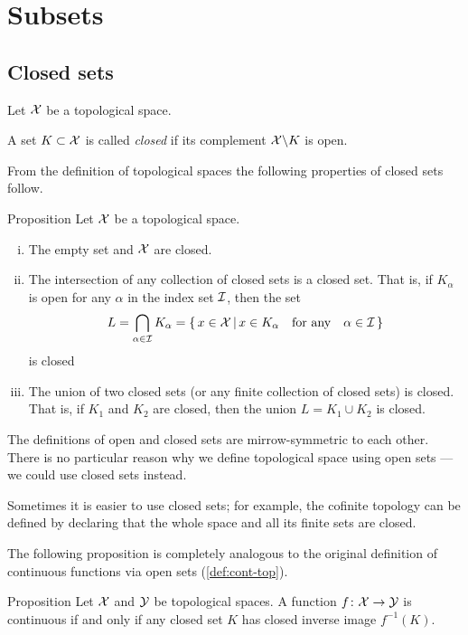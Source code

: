 \chapter{Subsets}

\section{Closed sets}

Let $\mathcal{X}$ be a topological space. 

A set $K\subset \mathcal{X}$ is called \emph{closed} if its complement $\mathcal{X}\backslash K$ is open.

From the definition of topological spaces the following properties of closed sets follow.

\begin{thm}{Proposition}\label{prop:closed-properties}
Let $\mathcal{X}$ be a topological space. 
\begin{enumerate}[(i)] 
\item The empty set and $\mathcal{X}$ are closed.
\item The intersection of any collection of closed sets is a closed set.
That is, if $K_\alpha$ is open for any $\alpha$ in the index set $\mathcal{I}$,
then the set
\[L=\bigcap_{\alpha\in \mathcal{I}} K_\alpha
=
\left\{\,{x\in \mathcal{X}}\,\middle|\,{x\in K_\alpha\quad\text{for any}\quad\alpha\in \mathcal{I}}\,\right\}\]
is closed
\item\label{def:top-space:n} 
The union of two closed sets (or any finite collection of closed sets) is closed.  
That is,  if $K_1$ and $K_2$ are closed, then the union $L=K_1 \cup K_2$ is closed. 
\end{enumerate}
\end{thm}

The definitions of open and closed sets are mirrow-symmetric to each other.
There is no particular reason why we define topological space using open sets --- we could use closed sets instead.

Sometimes it is easier to use closed sets; 
for example, the cofinite topology can be defined by declaring that the whole space and all its finite sets are closed.

The following proposition is completely analogous to the original definition of continuous functions via open sets (\ref{def:cont-top}). 

\begin{thm}{Proposition}\label{prop:cont-closed}
Let $\mathcal{X}$ and $\mathcal{Y}$ be topological spaces.
A function $f\colon\mathcal{X}\to\mathcal{Y}$ is continuous if and only if any closed set $K$ has closed inverse image $f^{-1}(K)$.
\end{thm}


